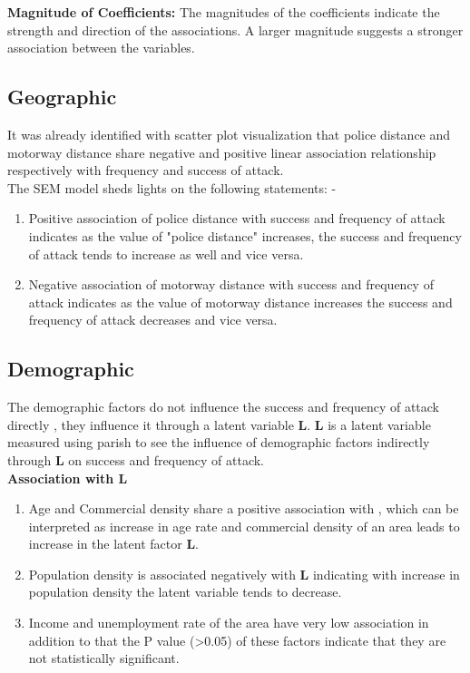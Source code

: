 \documentclass[10pt, conference, compsocconf]{IEEEtran}
\begin{document}
	\textbf{Magnitude of Coefficients:} The magnitudes of the coefficients indicate the strength and direction of the associations. A larger magnitude suggests a stronger association between the variables.
	
\subsection{Geographic}	
	It was already identified with scatter plot visualization that police distance and motorway distance share negative and positive linear association relationship respectively with frequency and success of attack.\\
	The SEM model sheds lights on the following statements: -
	\begin{enumerate}
		\item Positive association of police distance with success and frequency of attack indicates as the value of "police distance" increases, the success and frequency of attack tends to increase as well and vice versa.
		\item  Negative association of motorway distance with success and frequency of attack indicates as the value of motorway distance increases the success and frequency of attack decreases and vice versa.
	\end{enumerate}
\subsection{Demographic}
The demographic factors do not influence the success and frequency of attack directly , they influence it through a latent variable \textbf{L}. 
\textbf{L} is a latent variable measured using parish to see the influence of demographic factors  indirectly through \textbf{L}  on success and frequency of attack.\\
\textbf{Association with L}
\begin{enumerate}
	\item  Age and Commercial density share a positive association with , which can be interpreted as increase in age rate and commercial density of an area leads to increase in the latent factor \textbf{L}. 
	\item Population density is associated negatively with \textbf{L} indicating with increase in population density the latent variable tends to decrease.
	\item Income and unemployment rate of the area have very low association in addition to that the P value (\textgreater0.05) of these factors indicate that they are not statistically significant. 
\end{enumerate}
\end{document}
